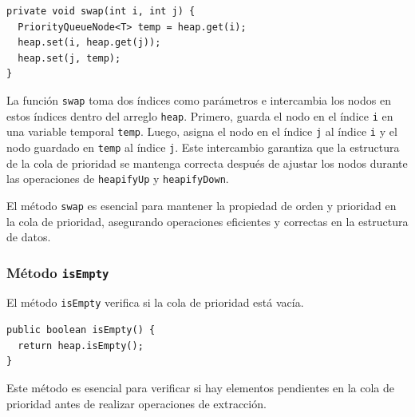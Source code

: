 \documentclass[10pt, a4paper]{article}
\newcommand{\mj}[1]{\texttt{#1}}
\begin{document}
\begin{verbatim}
private void swap(int i, int j) {
  PriorityQueueNode<T> temp = heap.get(i);
  heap.set(i, heap.get(j));
  heap.set(j, temp);
}
\end{verbatim}

La función \mj{swap} toma dos índices como parámetros e intercambia los nodos en estos índices dentro del arreglo \mj{heap}. Primero, guarda el nodo en el índice \mj{i} en una variable temporal \mj{temp}. Luego, asigna el nodo en el índice \mj{j} al índice \mj{i} y el nodo guardado en \mj{temp} al índice \mj{j}. Este intercambio garantiza que la estructura de la cola de prioridad se mantenga correcta después de ajustar los nodos durante las operaciones de \mj{heapifyUp} y \mj{heapifyDown}.

El método \mj{swap} es esencial para mantener la propiedad de orden y prioridad en la cola de prioridad, asegurando operaciones eficientes y correctas en la estructura de datos.

\subsubsection{Método \mj{isEmpty}}

El método \mj{isEmpty} verifica si la cola de prioridad está vacía.

\begin{verbatim}
public boolean isEmpty() {
  return heap.isEmpty();
}
\end{verbatim}

Este método es esencial para verificar si hay elementos pendientes en la cola de prioridad antes de realizar operaciones de extracción.
\end{document}
